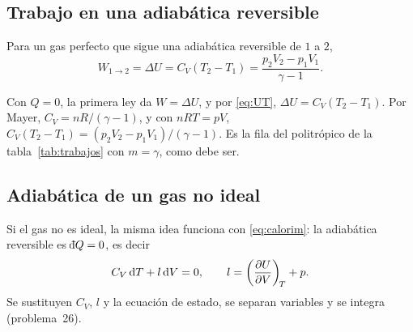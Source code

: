 \subsection{Trabajo en una adiabática reversible}

\begin{proposicion}
Para un gas perfecto que sigue una adiabática reversible de $1$ a $2$,
\begin{equation}\label{eq:Wad}
  W_{1\to2}=\Delta U=C_V(T_2-T_1)=\frac{p_2V_2-p_1V_1}{\gamma-1}.
\end{equation}
\end{proposicion}

\begin{demostracion}
Con $Q=0$, la primera ley da $W=\Delta U$, y por \eqref{eq:UT}, $\Delta U=C_V(T_2-T_1)$. Por Mayer,
$C_V=nR/(\gamma-1)$, y con $nRT=pV$, $C_V(T_2-T_1)=(p_2V_2-p_1V_1)/(\gamma-1)$. Es la fila del politrópico de
la tabla~\ref{tab:trabajos} con $m=\gamma$, como debe ser.
\end{demostracion}

\subsection{Adiabática de un gas no ideal}

Si el gas no es ideal, la misma idea funciona con \eqref{eq:calorim}: la adiabática reversible es
$\dbar Q=0$, es decir
\begin{equation}\label{eq:adgeneral}
  C_V\,\mathrm{d} T+l\,\mathrm{d} V=0,\qquad l=\left(\frac{\partial U}{\partial V}\right)_{\!T}+p .
\end{equation}
Se sustituyen $C_V$, $l$ y la ecuación de estado, se separan variables y se integra (problema~26).
